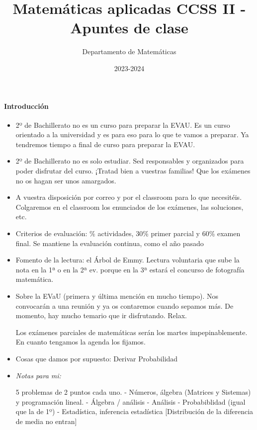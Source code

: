 \documentclass[nobuilddate]{Docencia}
\title{Matemáticas aplicadas CCSS II - Apuntes de clase}
\author{Departamento de Matemáticas}
\date{2023-2024}
\begin{document}
\pagestyle{plain}
\maketitle
\tableofcontents
\newpage

\newcommand{\hide}[1]{#1}

\renewcommand{\vec}[1]{\overrightarrow{#1}}

\paragraph{Introducción}

\begin{itemize}
    \item 2º de Bachillerato no es un curso para preparar la EVAU. Es un curso orientado a la universidad y es para eso para lo que te vamos a preparar. 
    Ya tendremos tiempo a final de curso para preparar la EVAU.
    
    \item 2º de Bachillerato no es solo estudiar. Sed responsables y organizados para poder disfrutar del curso. ¡Tratad bien a vuestras familias! Que los exámenes no os hagan ser unos amargados.
    
    \item A vuestra disposición por correo y por el classroom para lo que necesitéis. Colgaremos en el classroom los enunciados de los exámenes, las soluciones, etc.
    
    \item Criterios de evaluación: 
    \% actividades, 30\% primer parcial y 60\% examen final. 
    \subitem Se mantiene la evaluación continua, como el año pasado
    \item Fomento de la lectura: el Árbol de Emmy. Lectura voluntaria que sube la nota en la 1ª o en la 2ª ev. porque en la 3ª estará el concurso de fotografía matemática.


    \item Sobre la EVaU (primera y última mención en mucho tiempo). Nos convocarán a una reunión y ya os contaremos cuando sepamos más. De momento, hay mucho temario que ir disfrutando. Relax.

    \subitem Los exámenes parciales de matemáticas serán los martes impepinablemente. En cuanto tengamos la agenda los fijamos.


    \item Cosas que damos por supuesto: 
    \subitem Derivar
    \subitem Probabilidad

\item \textit{Notas para mi:}

5 problemas de 2 puntos cada uno.
-  Números, álgebra (Matrices y Sistemas) y programación lineal.
-  Álgebra / análisis
-  Análisis
-  Probabiblidad (igual que la de 1º)
-  Estadística, inferencia estadística [Distribución de la diferencia de media no entran]


\end{itemize}



%
%


\newpage
\printindex
\listoffigures
\listoftables
\end{document}
